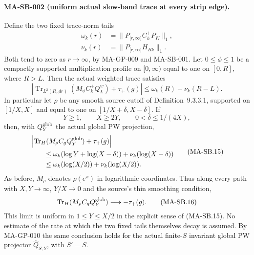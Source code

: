 \paragraph{MA-SB-002 (uniform actual slow-band trace at every strip edge).}
Define the two fixed trace-norm tails
\[
 \begin{aligned}
 \omega_k(r)&=\|P_{[r,\infty)}C_k^+P_K\|_1,\\
 \nu_k(r)&=\|P_{[r,\infty)}H_{Bk}\|_1 .
 \end{aligned}
 \tag{MA-SB.12}
\]
Both tend to zero as $r\to\infty$, by
MA-GP-009 and MA-SB-001.
Let $0\le\phi\le1$ be a compactly supported
multiplication profile on $[0,\infty)$ equal to one
on $[0,R]$, where $R>L$.
Then the actual weighted trace satisfies
\[
 \left|
 \operatorname{Tr}_{L^2(R_Ldr)}(M_\phi C_k^+Q_L^w)
                     +\tau_+(g)\right|
            \le\omega_k(R)+\nu_k(R-L).
 \tag{MA-SB.13}
\]
In particular let $\rho$ be any smooth source cutoff
of Definition~9.3.3.1, supported on $[1/X,X]$ and
equal to one on $[1/X+\delta,X-\delta]$.
If
\[
           Y\ge1,\qquad X\ge2Y,\qquad
           0<\delta\le1/(4X),
 \tag{MA-SB.14}
\]
then, with $Q_Y^{\rm glob}$ the actual global PW
projection,
\[
 \begin{aligned}
 &\left|\operatorname{Tr}_H(M_\rho C_gQ_Y^{\rm glob})
                    +\tau_+(g)\right|\\
 &\qquad\le
 \omega_k(\log Y+\log(X-\delta))
                 +\nu_k(\log(X-\delta))\\
 &\qquad\le
 \omega_k(\log(X/2))+\nu_k(\log(X/2)).
 \end{aligned}
 \tag{MA-SB.15}
\]
As before, $M_\rho$ denotes $\rho(e^x)$ in logarithmic
coordinates.
Thus along every path with $X,Y\to\infty$,
$Y/X\to0$ and the source's thin smoothing condition,
\[
           \operatorname{Tr}_H(M_\rho C_gQ_Y^{\rm glob})
                      \longrightarrow-\tau_+(g).
 \tag{MA-SB.16}
\]
This limit is uniform in $1\le Y\le X/2$ in the
explicit sense of (MA-SB.15).
No estimate of the rate at which the two fixed
tails themselves decay is assumed.
By MA-GP-010 the same conclusion holds for the
actual finite-$S$ invariant global PW projector
$\widehat Q_{S,Y}$, with $S'=S$.

